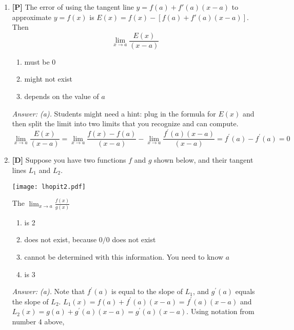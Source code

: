 \documentclass[12pt]{article}
\begin{document}
\begin{enumerate}
{\it Answer: (b).} Students might be inclined to answer $(a)$, since usually we use tangent line approximations for values of $x$ close to $a$; or they might choose (c), since the closer we are to $a$, the better the approximation will be, without realizing that we might get a good approximation even far from $a$.

\bigskip

\item {\bf [P]} The error of using the tangent line $y= f(a)+ f'(a)(x-a)$ to
approximate $y= f(x)$ is $E(x)=f(x)-[f(a)+f'(a)(x-a)]$.  Then
\[\lim_{x\rightarrow a}  \frac{E(x)}{(x-a)}\]
\begin{enumerate}
\item must be 0
\item might not exist
\item depends on the value of $a$
\end{enumerate}

{\it Answer: (a).} Students might need a hint: plug in the formula
for $E(x)$ and then split the limit into two limits that you
recognize and can compute.
$$\displaystyle{\lim_{x\rightarrow 
a}\frac{E(x)}{(x-a)}}=\displaystyle{\lim_{x\rightarrow 
a}\frac{f(x)-f(a)}{(x-a)}}-\displaystyle{\lim_{x\rightarrow 
a}\frac{f^{\prime}(a)(x-a)}{(x-a)}}=f^{\prime}(a)-f^{\prime}(a)=0$$

\bigskip

\item {\bf [D]} Suppose you have two functions $f$ and $g$ shown below, and 
their tangent lines $L_1$ and $L_2$.

\begin{center}
\texttt{[image: lhopit2.pdf]}
\end{center}

The $\displaystyle{\lim_{x\rightarrow a}\frac{f(x)}{g(x)}}$
\begin {enumerate}
\item is 2
\item does not exist, because $0/0$ does not exist
\item cannot be determined with this information. You need to know $a$
\item is 3
\end {enumerate}

{\it Answer: (a).} Note that $f^{\prime}(a)$ is equal to the slope of 
$L_1$, and $g^{\prime}(a)$ equals the slope of $L_2$.
$L_1(x)=f(a)+f^{\prime}(a)(x-a)=f^{\prime}(a)(x-a)$ and 
$L_2(x)=g(a)+g^{\prime}(a)(x-a)=g^{\prime}(a)(x-a)$. Using notation from 
number 4 above,


\end{enumerate}
\end{document}
